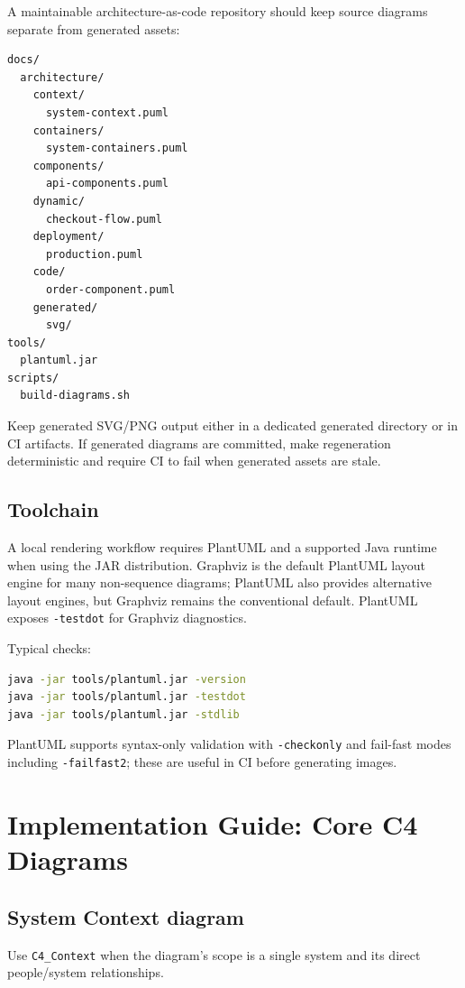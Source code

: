 \documentclass[11pt]{article}
\newcommand{\code}[1]{\texttt{#1}}
\begin{document}
A maintainable architecture-as-code repository should keep source diagrams separate from generated assets:

\begin{lstlisting}
docs/
  architecture/
    context/
      system-context.puml
    containers/
      system-containers.puml
    components/
      api-components.puml
    dynamic/
      checkout-flow.puml
    deployment/
      production.puml
    code/
      order-component.puml
    generated/
      svg/
tools/
  plantuml.jar
scripts/
  build-diagrams.sh
\end{lstlisting}

Keep generated SVG/PNG output either in a dedicated generated directory or in CI artifacts. If generated diagrams are committed, make regeneration deterministic and require CI to fail when generated assets are stale.

\subsection{Toolchain}

A local rendering workflow requires PlantUML and a supported Java runtime when using the JAR distribution. Graphviz is the default PlantUML layout engine for many non-sequence diagrams; PlantUML also provides alternative layout engines, but Graphviz remains the conventional default. PlantUML exposes \code{-testdot} for Graphviz diagnostics.\cite{plantumlhome,plantumlinstall}

Typical checks:

\begin{lstlisting}[language=bash]
java -jar tools/plantuml.jar -version
java -jar tools/plantuml.jar -testdot
java -jar tools/plantuml.jar -stdlib
\end{lstlisting}

PlantUML supports syntax-only validation with \code{-checkonly} and fail-fast modes including \code{-failfast2}; these are useful in CI before generating images.\cite{plantumlcli}

\section{Implementation Guide: Core C4 Diagrams}

\subsection{System Context diagram}

Use \code{C4\_Context} when the diagram's scope is a single system and its direct people/system relationships.
\end{document}
